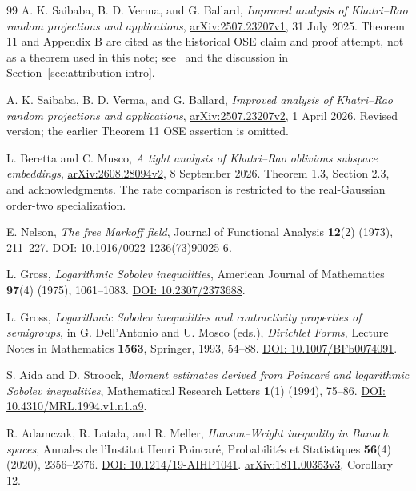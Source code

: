 \documentclass[11pt]{article}
\numberwithin{equation}{section}
\theoremstyle{definition}\newtheorem{definition}[theorem]{Definition}
\theoremstyle{remark}\newtheorem{remark}[theorem]{Remark}
\begin{document}
\begin{thebibliography}{99}
A. K. Saibaba, B. D. Verma, and G. Ballard,
\emph{Improved analysis of Khatri--Rao random projections and applications},
\href{https://arxiv.org/abs/2507.23207v1}{arXiv:2507.23207v1}, 31 July 2025.
Theorem 11 and Appendix B are cited as the historical OSE claim and proof attempt,
not as a theorem used in this note; see~\cite{SVBv2,BM} and the discussion in
Section~\ref{sec:attribution-intro}.

A. K. Saibaba, B. D. Verma, and G. Ballard,
\emph{Improved analysis of Khatri--Rao random projections and applications},
\href{https://arxiv.org/abs/2507.23207v2}{arXiv:2507.23207v2}, 1 April 2026.
Revised version; the earlier Theorem 11 OSE assertion is omitted.

L. Beretta and C. Musco,
\emph{A tight analysis of Khatri--Rao oblivious subspace embeddings},
\href{https://arxiv.org/abs/2608.28094v2}{arXiv:2608.28094v2}, 8 September 2026.
Theorem 1.3, Section 2.3, and acknowledgments.
The rate comparison is restricted to the real-Gaussian order-two specialization.

E. Nelson, \emph{The free Markoff field},
Journal of Functional Analysis \textbf{12}(2) (1973), 211--227.
\href{https://doi.org/10.1016/0022-1236(73)90025-6}{DOI: 10.1016/0022-1236(73)90025-6}.

L. Gross, \emph{Logarithmic Sobolev inequalities},
American Journal of Mathematics \textbf{97}(4) (1975), 1061--1083.
\href{https://doi.org/10.2307/2373688}{DOI: 10.2307/2373688}.

L. Gross, \emph{Logarithmic Sobolev inequalities and contractivity properties of
semigroups}, in G. Dell'Antonio and U. Mosco (eds.), \emph{Dirichlet Forms},
Lecture Notes in Mathematics \textbf{1563}, Springer, 1993, 54--88.
\href{https://doi.org/10.1007/BFb0074091}{DOI: 10.1007/BFb0074091}.

S. Aida and D. Stroock,
\emph{Moment estimates derived from Poincar\'e and logarithmic Sobolev inequalities},
Mathematical Research Letters \textbf{1}(1) (1994), 75--86.
\href{https://doi.org/10.4310/MRL.1994.v1.n1.a9}{DOI: 10.4310/MRL.1994.v1.n1.a9}.

R. Adamczak, R. Lata\l a, and R. Meller,
\emph{Hanson--Wright inequality in Banach spaces},
Annales de l'Institut Henri Poincar\'e, Probabilit\'es et Statistiques
\textbf{56}(4) (2020), 2356--2376.
\href{https://doi.org/10.1214/19-AIHP1041}{DOI: 10.1214/19-AIHP1041}.
\href{https://arxiv.org/abs/1811.00353v3}{arXiv:1811.00353v3}, Corollary 12.


\end{thebibliography}
\end{document}
